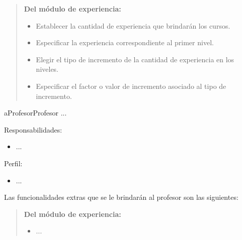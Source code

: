     \begin{quote}

    {\bf Del módulo de experiencia:}
        \begin{itemize}
        \item Establecer la cantidad de experiencia que brindarán los cursos.
        \item Especificar la experiencia correspondiente al primer nivel.
        \item Elegir el tipo de incremento de la cantidad de experiencia en los niveles.
        \item Especificar el factor o valor de incremento asociado al tipo de incremento.
        \end{itemize}

    \end{quote}


    \begin{actor}{aProfesor}{Profesor}{%
        ...}

    \item[Responsabilidades:] \hfill
        \begin{itemize}
        \item ...
        \end{itemize}

    \item[Perfil:] \hfill
        \begin{itemize}
        \item ...
        \end{itemize}
    \end{actor}

 \noindent
 Las funcionalidades extras que se le brindarán al profesor son las siguientes:

    \begin{quote}

    {\bf Del módulo de experiencia:}
        \begin{itemize}
        \item ...
        \end{itemize}

    \end{quote}


